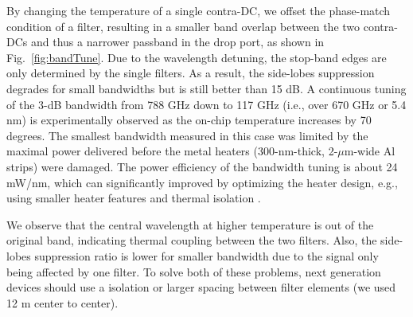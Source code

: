 \documentclass[9pt,twocolumn,twoside]{osajnl}
\begin{document}
By changing the temperature of a single contra-DC, we offset the phase-match condition of a filter, resulting in a smaller band overlap between the two contra-DCs and thus a narrower passband in the drop port, as shown in Fig.~\ref{fig:bandTune}.  
Due to the wavelength detuning,  the stop-band edges are only determined by the single filters. 
As a result, the side-lobes suppression degrades  for small bandwidths but is still better than 15 dB. A continuous tuning of the 3-dB bandwidth from 788 GHz down to 117 GHz (i.e., over 670 GHz or 5.4 nm) is experimentally observed as the on-chip temperature increases by 70 degrees. 
The smallest bandwidth measured in this case was limited by the maximal power delivered before the metal heaters (300-nm-thick, 2-$\mu$m-wide Al strips) were damaged. 
The power efficiency of the bandwidth tuning is about 24 mW/nm, which can significantly improved by optimizing the heater design, e.g., using smaller heater features and thermal isolation \cite{dong2010thermally}.

We observe that the central wavelength at higher temperature is out of the original band, indicating thermal coupling between the two filters. Also, the side-lobes suppression ratio is lower for smaller bandwidth due to the signal only being affected by one filter. To solve both of these problems, next generation devices should use a isolation or larger spacing between filter elements (we used 12 \text{$\mu$}m center to center).
\end{document}
